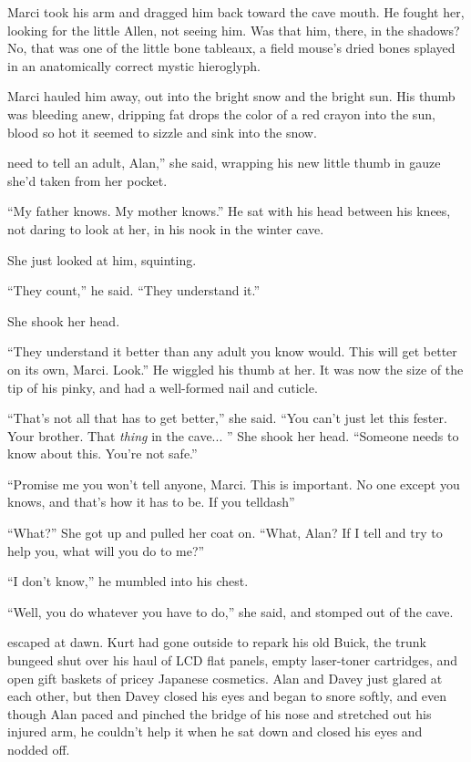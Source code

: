 Marci took his arm and dragged him back toward the cave mouth.  He
fought her, looking for the little Allen, not seeing him.  Was that
him, there, in the shadows?  No, that was one of the little bone
tableaux, a field mouse's dried bones splayed in an anatomically
correct mystic hieroglyph.

Marci hauled him away, out into the bright snow and the bright sun. 
His thumb was bleeding anew, dripping fat drops the color of a red
crayon into the sun, blood so hot it seemed to sizzle and sink into
the snow.

need to tell an adult, Alan,'' she said, wrapping his new little
thumb in gauze she'd taken from her pocket.

``My father knows.  My mother knows.'' He sat with his head between
his knees, not daring to look at her, in his nook in the winter cave.

She just looked at him, squinting.

``They count,'' he said.  ``They understand it.''

She shook her head.

``They understand it better than any adult you know would.  This will
get better on its own, Marci.  Look.'' He wiggled his thumb at her. 
It was now the size of the tip of his pinky, and had a well-formed
nail and cuticle.

``That's not all that has to get better,'' she said.  ``You can't just
let this fester.  Your brother.  That \textit{thing} in the cave... 
'' She shook her head.  ``Someone needs to know about this.  You're
not safe.''

``Promise me you won't tell anyone, Marci.  This is important.  No one
except you knows, and that's how it has to be.  If you telldash{}''

``What?'' She got up and pulled her coat on.  ``What, Alan?  If I tell
and try to help you, what will you do to me?''

``I don't know,'' he mumbled into his chest.

``Well, you do whatever you have to do,'' she said, and stomped out of
the cave.

 escaped at dawn.  Kurt had gone outside to repark his old Buick,
the trunk bungeed shut over his haul of LCD flat panels, empty
laser-toner cartridges, and open gift baskets of pricey Japanese
cosmetics.  Alan and Davey just glared at each other, but then Davey
closed his eyes and began to snore softly, and even though Alan paced
and pinched the bridge of his nose and stretched out his injured arm,
he couldn't help it when he sat down and closed his eyes and nodded
off.

